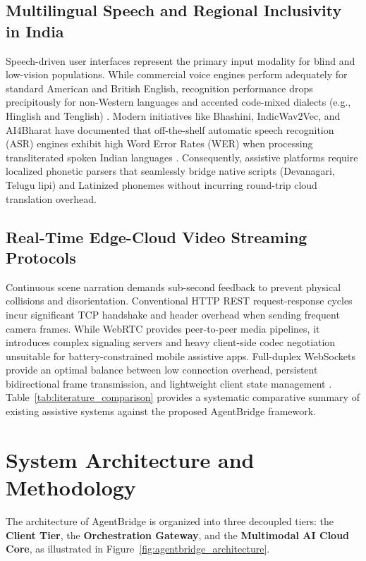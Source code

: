 \documentclass[10pt,a4paper]{article}
\begin{document}
\subsection{Multilingual Speech and Regional Inclusivity in India}
Speech-driven user interfaces represent the primary input modality for blind and low-vision populations. While commercial voice engines perform adequately for standard American and British English, recognition performance drops precipitously for non-Western languages and accented code-mixed dialects (e.g., Hinglish and Tenglish) \citep{jawahar2021indicnlp}. Modern initiatives like Bhashini, IndicWav2Vec, and AI4Bharat have documented that off-the-shelf automatic speech recognition (ASR) engines exhibit high Word Error Rates (WER) when processing transliterated spoken Indian languages \citep{kumar2022indic}. Consequently, assistive platforms require localized phonetic parsers that seamlessly bridge native scripts (Devanagari, Telugu lipi) and Latinized phonemes without incurring round-trip cloud translation overhead.

\subsection{Real-Time Edge-Cloud Video Streaming Protocols}
Continuous scene narration demands sub-second feedback to prevent physical collisions and disorientation. Conventional HTTP REST request-response cycles incur significant TCP handshake and header overhead when sending frequent camera frames. While WebRTC provides peer-to-peer media pipelines, it introduces complex signaling servers and heavy client-side codec negotiation unsuitable for battery-constrained mobile assistive apps. Full-duplex WebSockets provide an optimal balance between low connection overhead, persistent bidirectional frame transmission, and lightweight client state management \citep{fette2011websocket}. Table~\ref{tab:literature_comparison} provides a systematic comparative summary of existing assistive systems against the proposed AgentBridge framework.

\section{System Architecture and Methodology}

The architecture of AgentBridge is organized into three decoupled tiers: the \textbf{Client Tier}, the \textbf{Orchestration Gateway}, and the \textbf{Multimodal AI Cloud Core}, as illustrated in Figure~\ref{fig:agentbridge_architecture}.
\end{document}
